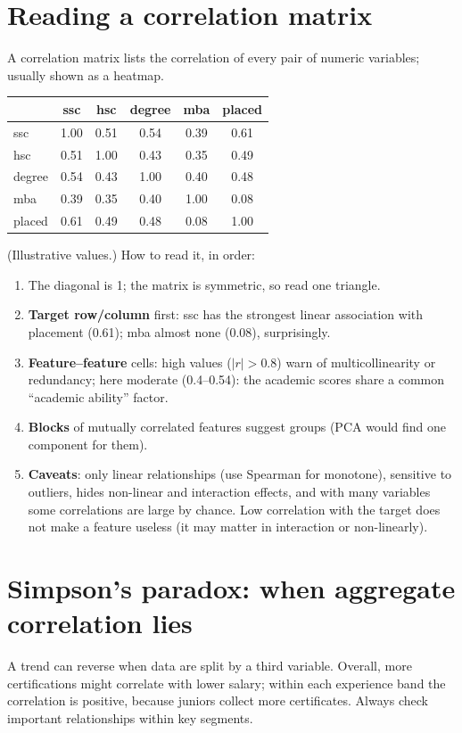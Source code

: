 \section{Reading a correlation matrix}
A correlation matrix lists the correlation of every pair of numeric variables; usually shown as a heatmap.
\begin{center}\small
\begin{tabular}{l|ccccc}
& ssc & hsc & degree & mba & placed\\\hline
ssc & 1.00 & 0.51 & 0.54 & 0.39 & 0.61\\
hsc & 0.51 & 1.00 & 0.43 & 0.35 & 0.49\\
degree & 0.54 & 0.43 & 1.00 & 0.40 & 0.48\\
mba & 0.39 & 0.35 & 0.40 & 1.00 & 0.08\\
placed & 0.61 & 0.49 & 0.48 & 0.08 & 1.00\\
\end{tabular}
\end{center}
(Illustrative values.) How to read it, in order:
\begin{enumerate}
\item The diagonal is 1; the matrix is symmetric, so read one triangle.
\item \textbf{Target row/column} first: ssc has the strongest linear association with placement (0.61); mba almost none (0.08), surprisingly.
\item \textbf{Feature--feature} cells: high values ($|r| > 0.8$) warn of multicollinearity or redundancy; here moderate (0.4--0.54): the academic scores share a
  common ``academic ability'' factor.
\item \textbf{Blocks} of mutually correlated features suggest groups (PCA would find one component for them).
\item \textbf{Caveats}: only linear relationships (use Spearman for monotone), sensitive to outliers, hides non-linear and interaction effects, and with many variables
  some correlations are large by chance. Low correlation with the target does not make a feature useless (it may matter in interaction or non-linearly).
\end{enumerate}

\section{Simpson's paradox: when aggregate correlation lies}
A trend can reverse when data are split by a third variable. Overall, more certifications might correlate with lower salary; within each experience band the
correlation is positive, because juniors collect more certificates. Always check important relationships within key segments.

